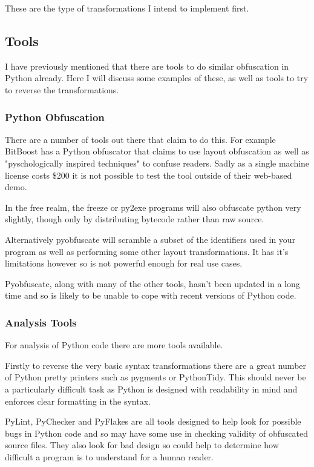 \documentclass{report}
\begin{document}
These are the type of transformations I intend to implement first.

\subsection{Tools}

I have previously mentioned that there are tools to do similar obfuscation in Python already. Here I will discuss some
examples of these, as well as tools to try to reverse the transformations.

\subsubsection{Python Obfuscation}

There are a number of tools out there that claim to do this. For example BitBoost has a Python obfuscator\cite{bitboost}
that claims to use layout obfuscation as well as "pyschologically inspired techniques" to confuse readers. Sadly as a
single machine license costs \$200 it is not possible to test the tool outside of their web-based demo.

In the free realm, the freeze\cite{freezereadme} or py2exe\cite{py2exe} programs will also obfuscate python very slightly,
though only by distributing bytecode rather than raw source.

Alternatively pyobfuscate\cite{pyobf} will scramble a subset of the identifiers used in your program as well as performing
some other layout transformations. It has it's limitations however\cite{pyobf} so is not powerful enough for real use cases.

Pyobfuscate, along with many of the other tools, hasn't been updated in a long time and so is likely to be unable to cope with
recent versions of Python code.

\subsubsection{Analysis Tools}

For analysis of Python code there are more tools available.

Firstly to reverse the very basic syntax transformations there are a great number of Python pretty printers such as
pygments\cite{pygments} or PythonTidy\cite{pythontidy}. This should never be a particularly difficult task as Python is
designed with readability in mind and enforces clear formatting in the syntax.

PyLint\cite{pylint}, PyChecker\cite{pychecker} and PyFlakes\cite{pyflakes} are all tools designed to help look for possible
bugs in Python code and so may have some use in checking validity of obfuscated source files. They also look for bad design so
could help to determine how difficult a program is to understand for a human reader.
\end{document}
